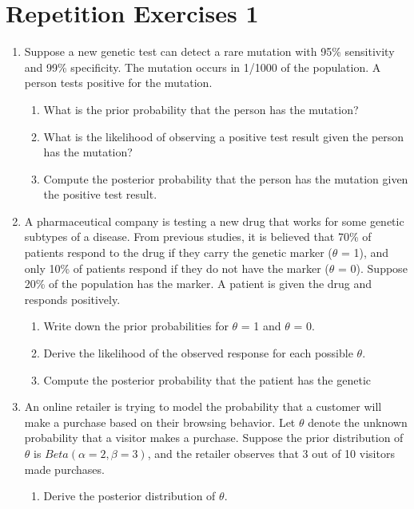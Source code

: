 \documentclass[12pt,a4paper,twoside]{article}
\begin{document}
\section{Repetition Exercises 1}
\begin{enumerate}
    \item Suppose a new genetic test can detect a rare mutation with 95\% sensitivity and 99\%
    specificity. The mutation occurs in 1/1000 of the population. A person tests positive for
    the mutation.
    \begin{enumerate}[label=$\alph*)$]
        \item What is the prior probability that the person has the mutation?
        \item What is the likelihood of observing a positive test result given the person has
        the mutation?
        \item Compute the posterior probability that the person has the mutation given the positive
        test result.
    \end{enumerate}
    \item A pharmaceutical company is testing a new drug that works for some genetic subtypes of a
    disease. From previous studies, it is believed that 70\% of patients respond to the drug if they
    carry the genetic marker ($\theta$ = 1), and only 10\% of patients respond if they do not have
    the marker ($\theta$ = 0). Suppose 20\% of the population has the marker. A patient is given the
    drug and responds positively.
    \begin{enumerate}[label=$\alph*)$]
        \item Write down the prior probabilities for $\theta$ = 1 and $\theta$ = 0.
        \item Derive the likelihood of the observed response for each possible $\theta$.
        \item Compute the posterior probability that the patient has the genetic
    \end{enumerate}
    \item An online retailer is trying to model the probability that a customer will make a purchase
    based on their browsing behavior. Let $\theta$ denote the unknown probability that a visitor makes
    a purchase. Suppose the prior distribution of $\theta$ is $Beta(\alpha = 2, \beta = 3)$, and
    the retailer observes that 3 out of 10 visitors made purchases.
    \begin{enumerate}[label=$\alph*)$]
        \item Derive the posterior distribution of $\theta$.

\end{enumerate}
\end{enumerate}
\end{document}
